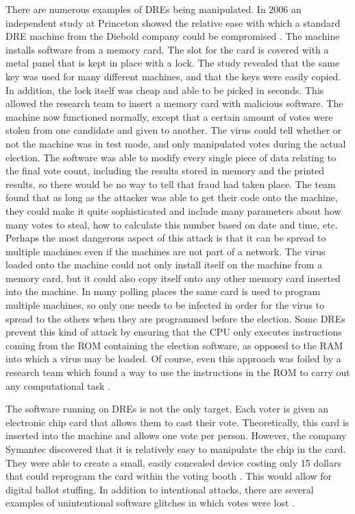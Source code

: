 \documentclass[12pt, titlepage]{article}
\begin{document}
There are numerous examples of DREs being manipulated. In 2006 an independent study at Princeton showed the relative ease with which a standard DRE machine from the Diebold company could be compromised \cite{feldman2006security}. The machine installs software from a memory card. The slot for the card is covered with a metal panel that is kept in place with a lock. The study revealed that the same key was used for many different machines, and that the keys were easily copied. In addition, the   lock itself was cheap and able to be picked in seconds. This allowed the research team to insert a memory card with malicious software. The machine now functioned normally, except that a certain amount of votes were stolen from one candidate and given to another. The virus could tell whether or not the machine was in test mode, and only manipulated votes during the actual election. The software was able to modify every single piece of data relating to the final vote count, including the results stored in memory and the printed results, so there would be no way to tell that fraud had taken place. The team found that as long as the attacker was able to get their code onto the machine, they could make it quite sophisticated and include many parameters about how many votes to steal, how to calculate this number based on date and time, etc. Perhaps the most dangerous aspect of this attack is that it can be spread to multiple machines even if the machines are not part of a network. The virus loaded onto the machine could not only install itself on the machine from a memory card, but it could also copy itself onto any other memory card inserted into the machine. In many polling places the same card is used to program multiple machines, so only one needs to be infected in order for the virus to spread to the others when they are programmed before the election. Some DREs prevent this kind of attack by ensuring that the CPU only executes instructions coming from the ROM containing the election software, as opposed to the RAM into which a virus may be loaded. Of course, even this approach was foiled by a research team which found a way to use the instructions in the ROM to carry out any computational task \cite{hao2016real}.

The software running on DREs is not the only target. Each voter is given an electronic chip card that allows them to cast their vote. Theoretically, this card is inserted into the machine and allows one vote per person. However, the company Symantec discovered that it is relatively easy to manipulate the chip in the card. They were able to create a small, easily concealed device costing only 15 dollars that could reprogram the card within the voting booth \cite{symantec}. This would allow for digital ballot stuffing. In addition to intentional attacks, there are several examples of unintentional software glitches in which votes were lost \cite{lostvotes}.
\end{document}
